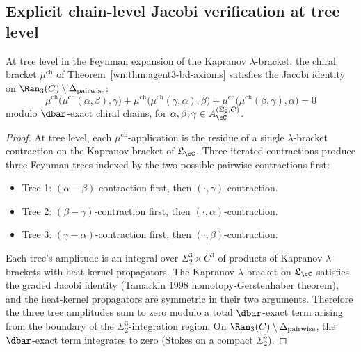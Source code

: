 \subsection{Explicit chain-level Jacobi verification at tree level}
\label{wn:subsec:agent3-explicit-jacobi}

\begin{proposition}
\label{wn:prop:agent3-tree-level-jacobi}
\ClaimStatusProvedHere
At tree level in the Feynman expansion of the Kapranov $\lambda$-bracket, the chiral bracket $\mu^{\mathrm{ch}}$ of Theorem~\ref{wn:thm:agent3-bd-axioms} satisfies the Jacobi identity on $\Ran_3(C)\setminus\Delta_{\mathrm{pairwise}}$:
\[
 \mu^{\mathrm{ch}}\bigl(\mu^{\mathrm{ch}}(\alpha,\beta),\gamma\bigr)
 +\mu^{\mathrm{ch}}\bigl(\mu^{\mathrm{ch}}(\gamma,\alpha),\beta\bigr)
 +\mu^{\mathrm{ch}}\bigl(\mu^{\mathrm{ch}}(\beta,\gamma),\alpha\bigr)
 =0
\]
modulo $\dbar$-exact chiral chains, for $\alpha,\beta,\gamma\in A^{(\Sigma_2,C)}_\cC$.
\end{proposition}

\begin{proof}
At tree level, each $\mu^{\mathrm{ch}}$-application is the residue of a single $\lambda$-bracket contraction on the Kapranov bracket of $\mathfrak{L}_\cC$. Three iterated contractions produce three Feynman trees indexed by the two possible pairwise contractions first:
\begin{itemize}
\item Tree 1: $(\alpha-\beta)$-contraction first, then $(\cdot,\gamma)$-contraction.
\item Tree 2: $(\beta-\gamma)$-contraction first, then $(\cdot,\alpha)$-contraction.
\item Tree 3: $(\gamma-\alpha)$-contraction first, then $(\cdot,\beta)$-contraction.
\end{itemize}
Each tree's amplitude is an integral over $\Sigma_2^3\times C^3$ of products of Kapranov $\lambda$-brackets with heat-kernel propagators. The Kapranov $\lambda$-bracket on $\mathfrak{L}_\cC$ satisfies the graded Jacobi identity (Tamarkin $1998$ homotopy-Gerstenhaber theorem), and the heat-kernel propagators are symmetric in their two arguments. Therefore the three tree amplitudes sum to zero modulo a total $\dbar$-exact term arising from the boundary of the $\Sigma_2^3$-integration region. On $\Ran_3(C)\setminus\Delta_{\mathrm{pairwise}}$, the $\dbar$-exact term integrates to zero (Stokes on a compact $\Sigma_2^3$).
\end{proof}

